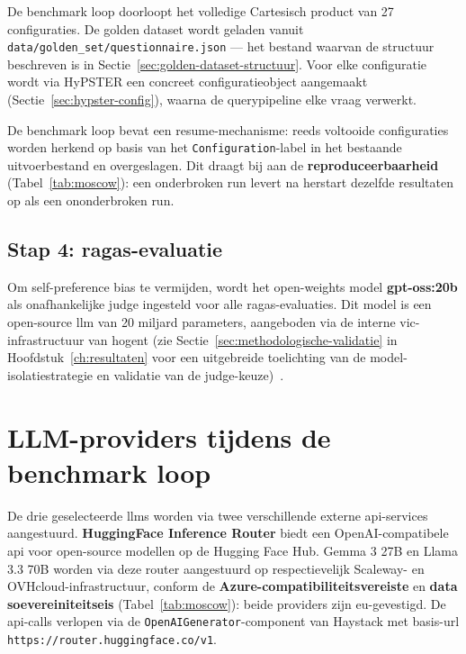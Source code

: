 De benchmark loop doorloopt het volledige Cartesisch product van 27 configuraties. De golden dataset wordt geladen vanuit \texttt{data/golden\_set/questionnaire.json} — het bestand waarvan de structuur beschreven is in Sectie~\ref{sec:golden-dataset-structuur}. Voor elke configuratie wordt via HyPSTER een concreet configuratieobject aangemaakt (Sectie~\ref{sec:hypster-config}), waarna de querypipeline elke vraag verwerkt.

De benchmark loop bevat een resume-mechanisme: reeds voltooide configuraties worden herkend op basis van het \texttt{Configuration}-label in het bestaande uitvoerbestand en overgeslagen. Dit draagt bij aan de \textbf{reproduceerbaarheid} (Tabel~\ref{tab:moscow}): een onderbroken run levert na herstart dezelfde resultaten op als een ononderbroken run.

\subsection{Stap 4: \gls{ragas}-evaluatie}

Om self-preference bias te vermijden, wordt het open-weights model \textbf{gpt-oss:20b} als onafhankelijke judge ingesteld voor alle \gls{ragas}-evaluaties. Dit model is een open-source \gls{llm} van 20 miljard parameters, aangeboden via de interne \gls{vic}-infrastructuur van \gls{hogent} (zie Sectie~\ref{sec:methodologische-validatie} in Hoofdstuk~\ref{ch:resultaten} voor een uitgebreide toelichting van de model-isolatiestrategie en validatie van de judge-keuze)~\autocite{OpenAI2025a}.

\section{LLM-providers tijdens de benchmark loop}
\label{sec:llm-providers}

De drie geselecteerde \glspl{llm} worden via twee verschillende externe \gls{api}-services aangestuurd. \textbf{HuggingFace Inference Router} biedt een OpenAI-compatibele \gls{api} voor open-source modellen op de Hugging Face Hub. Gemma 3 27B en Llama 3.3 70B worden via deze router aangestuurd op respectievelijk Scaleway- en OVHcloud-infrastructuur, conform de \textbf{Azure-compatibiliteitsvereiste} en \textbf{data soevereiniteitseis} (Tabel~\ref{tab:moscow}): beide providers zijn \gls{eu}-gevestigd. De \gls{api}-calls verlopen via de \texttt{OpenAIGenerator}-component van Haystack met basis-\gls{url} \texttt{https://router.huggingface.co/v1}.

